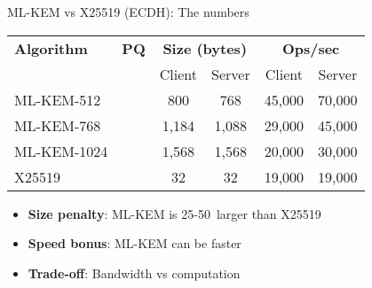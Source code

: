 \documentclass[aspectratio=169, lualatex, handout]{beamer}
\begin{document}
\begin{frame}{ML-KEM vs X25519 (ECDH): The numbers}
	\begin{center}
		\begin{tabular}{|l|c|c|c|c|c|}
			\hline
			\textbf{Algorithm} & \textbf{PQ}  & \multicolumn{2}{c|}{\textbf{Size (bytes)}} & \multicolumn{2}{c|}{\textbf{Ops/sec}}                   \\
			                   &              & Client                                     & Server                                & Client & Server \\
			\hline
			ML-KEM-512         & \mycheckmark & 800                                        & 768                                   & 45,000 & 70,000 \\
			ML-KEM-768         & \mycheckmark & 1,184                                      & 1,088                                 & 29,000 & 45,000 \\
			ML-KEM-1024        & \mycheckmark & 1,568                                      & 1,568                                 & 20,000 & 30,000 \\
			X25519             & \times       & 32                                         & 32                                    & 19,000 & 19,000 \\
			\hline
		\end{tabular}
	\end{center}
	\vspace{3mm}
	\begin{itemize}
		\item \textbf{Size penalty}: ML-KEM is 25-50\times\ larger than X25519
		\item \textbf{Speed bonus}: ML-KEM can be faster
		\item \textbf{Trade-off}: Bandwidth vs computation
	\end{itemize}
\end{frame}
\end{document}
